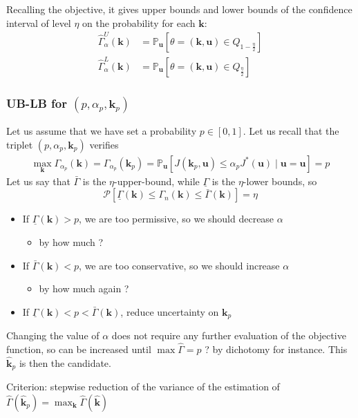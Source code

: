 \documentclass[a4paper,11pt]{article}
\newcommand{\Prob}{\mathbb{P}}
\newcommand{\ProbGP}{\mathcal{P}}
\newcommand{\kk}{\mathbf{k}}
\newcommand{\uu}{\mathbf{u}}
\theoremstyle{defi}
\numberwithin{thmCounter}{section}
\begin{document}
Recalling the objective, it gives upper bounds and lower bounds of the confidence interval of level $\eta$ on the probability for each $\kk$:
\begin{align}
  \hat{\Gamma}_{\alpha}^{U}(\kk) &= \Prob_\uu\left[\theta=(\kk,\uu) \in Q_{1-\frac{\eta}{2}}\right] \\
  \hat{\Gamma}_{\alpha}^{L}(\kk) &= \Prob_\uu\left[\theta=(\kk,\uu) \in Q_{\frac{\eta}{2}}\right]
\end{align}



\subsubsection{UB-LB for $(p, \alpha_p, \kk_p)$}
Let us assume that we have set a probability $p\in [0,1]$. Let us recall that the triplet $(p, \alpha_p, \kk_p)$ verifies
\begin{align}
  \max_{\kk} \Gamma_{\alpha_p}(\kk) = \Gamma_{\alpha_p}(\kk_p) = \Prob_{\uu}\left[J(\kk_p,\uu) \leq \alpha_p J^*(\uu)\mid \uu = \uu\right] = p
\end{align}
Let us say that $\bar{\Gamma}$ is the $\eta$-upper-bound, while $\underline{\Gamma}$ is the $\eta$-lower bounds, so
\begin{equation}
  \ProbGP\left[\underline{\Gamma}(\kk) \leq \Gamma_n(\kk) \leq \bar{\Gamma}(\kk)\right] = \eta
\end{equation}
\begin{itemize}
\item If $\underline{\Gamma}(\kk)>p$, we are too permissive, so we should decrease $\alpha$
  \begin{itemize}
  \item by how much ?
  \end{itemize}
\item If $\bar{\Gamma}(\kk)<p$, we are too conservative, so we should increase $\alpha$
  \begin{itemize}
  \item by how much again ?
  \end{itemize}
 \item If $\underline{\Gamma}(\kk)<p<\bar{\Gamma}(\kk)$, reduce uncertainty on $\kk_p$
\end{itemize}
Changing the value of $\alpha$ does not require any further evaluation of the objective function, so can be increased until $\max \hat{\Gamma} = p$ ? by dichotomy for instance. This $\hat{\kk}_p$ is then the candidate.

Criterion: stepwise reduction of the variance of the estimation of $\hat{\Gamma}(\hat{\kk}_p) = \max_{\kk}\hat{\Gamma}(\hat{\kk})$
\end{document}
